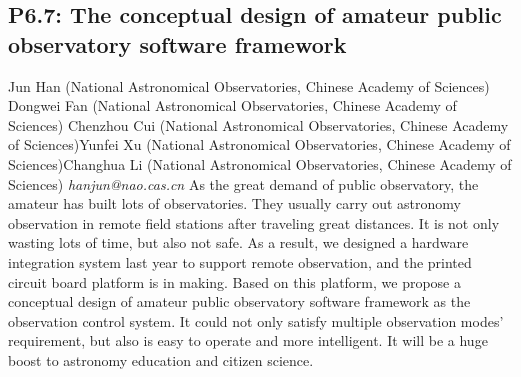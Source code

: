 \documentclass{report}
\begin{document}
\subsection*{P6.7: The conceptual design of amateur public observatory software framework}
\bigskip
Jun Han (National Astronomical Observatories, Chinese Academy of Sciences) \newline Dongwei Fan (National Astronomical Observatories, Chinese Academy of Sciences) \newline  Chenzhou Cui (National Astronomical Observatories, Chinese Academy of Sciences)\newline  Yunfei Xu (National Astronomical Observatories, Chinese Academy of Sciences)\newline Changhua Li (National Astronomical Observatories, Chinese Academy of Sciences)\newline  \newline\newline
{\it hanjun@nao.cas.cn}\newline
\newline\newline
As the great demand of public observatory, the amateur has built lots of observatories. They usually carry out astronomy observation in remote field stations after traveling great distances. It is not only wasting lots of time, but also not safe. As a result, we designed a hardware integration system last year to support remote observation, and the printed circuit board platform is in making.  Based on this platform, we propose a conceptual design of amateur public observatory software framework as the observation control system. It could not only satisfy multiple observation modes' requirement, but also is easy to operate and more intelligent. It will be a huge boost to astronomy education and citizen science.\newline
\newpage
\end{document}
